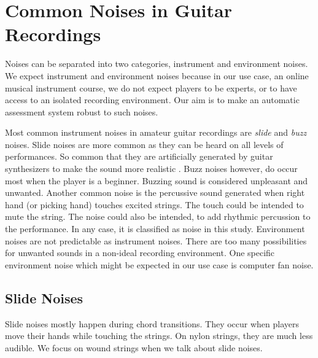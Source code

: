 \chapter{Common Noises in Guitar Recordings}

Noises can be separated into two categories, instrument and environment noises. We expect instrument and environment noises because in our use case, an online musical instrument course, we do not expect players to be experts, or to have access to an isolated recording environment. Our aim is to make an automatic assessment system robust to such noises. 

Most common instrument noises in amateur guitar recordings are \textit{slide} and \textit{buzz} noises. Slide noises are more common as they can be heard on all levels of performances. So common that they are artificially generated by guitar synthesizers to make the sound more realistic \cite{pakarinen2007analysis}. Buzz noises however, do occur most when the player is a beginner. Buzzing sound is considered unpleasant and unwanted. Another common noise is the percussive sound generated when right hand (or picking hand) touches excited strings. The touch could be intended to mute the string. The noise could also be intended, to add rhythmic percussion to the performance. In any case, it is classified as noise in this study. Environment noises are not predictable as instrument noises. There are too many possibilities for unwanted sounds in a non-ideal recording environment. One specific environment noise which might be expected in our use case is computer fan noise.

\section{Slide Noises}

Slide noises mostly happen during chord transitions. They occur when players move their hands while touching the strings. On nylon strings, they are much less audible. We focus on wound strings when we talk about slide noises. 

